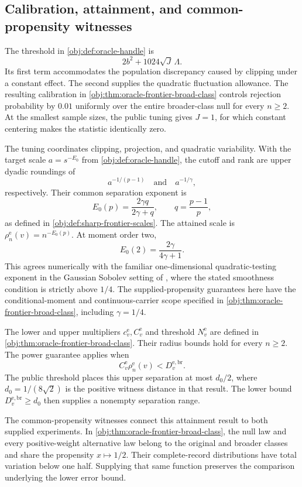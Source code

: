\documentclass[11pt]{article}
\begin{document}
\subsection{Calibration, attainment, and common-propensity witnesses}

The threshold in \cref{obj:def:oracle-handle} is
\[
2b^2+1024\sqrt J\,\Lambda.
\]
Its first term accommodates the population discrepancy caused by clipping under a constant effect. The second supplies the quadratic fluctuation allowance. The resulting calibration in \cref{obj:thm:oracle-frontier-broad-class} controls rejection probability by \(0.01\) uniformly over the entire broader-class null for every \(n\ge2\). At the smallest sample sizes, the public tuning gives \(J=1\), for which constant centering makes the statistic identically zero.

The tuning coordinates clipping, projection, and quadratic variability. With the target scale \(a=s^{-E_0}\) from \cref{obj:def:oracle-handle}, the cutoff and rank are upper dyadic roundings of
\[
a^{-1/(p-1)}
\quad\text{and}\quad
a^{-1/\gamma},
\]
respectively. Their common separation exponent is
\[
E_0(p)=\frac{2\gamma q}{2\gamma+q},
\qquad q=\frac{p-1}{p},
\]
as defined in \cref{obj:def:sharp-frontier-scales}. The attained scale is \(\rho_n^{\mathrm e}(v)=n^{-E_0(p)}\). At moment order two,
\[
E_0(2)=\frac{2\gamma}{4\gamma+1}.
\]
This agrees numerically with the familiar one-dimensional quadratic-testing exponent in the Gaussian Sobolev setting of \citet[Section~6.1, pp.~249--250]{IngsterSapatinas2009GoodnessOfFit}, where the stated smoothness condition is strictly above \(1/4\). The supplied-propensity guarantees here have the conditional-moment and continuous-carrier scope specified in \cref{obj:thm:oracle-frontier-broad-class}, including \(\gamma=1/4\).

The lower and upper multipliers \(c_v^{\mathrm e},C_v^{\mathrm e}\) and threshold \(N_v^{\mathrm e}\) are defined in \cref{obj:thm:oracle-frontier-broad-class}. Their radius bounds hold for every \(n\ge2\). The power guarantee applies when
\[
C_v^{\mathrm e}\rho_n^{\mathrm e}(v)<D_v^{\mathrm{e,br}}.
\]
The public threshold places this upper separation at most \(d_0/2\), where \(d_0=1/(8\sqrt2)\) is the positive witness distance in that result. The lower bound \(D_v^{\mathrm{e,br}}\ge d_0\) then supplies a nonempty separation range.

The common-propensity witnesses connect this attainment result to both supplied experiments. In \cref{obj:thm:oracle-frontier-broad-class}, the null law and every positive-weight alternative law belong to the original and broader classes and share the propensity \(x\mapsto1/2\). Their complete-record distributions have total variation below one half. Supplying that same function preserves the comparison underlying the lower error bound.
\end{document}
